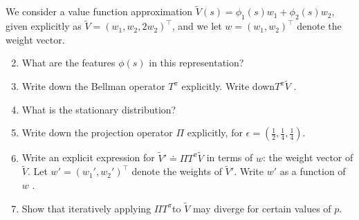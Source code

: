 \begin{exercise}
We consider a value function approximation $\tilde V(s) = {\phi _1}(s){w_1} + {\phi _2}(s){w_2}$, given explicitly as $\tilde V = {\left( {{w_1},{w_2},2{w_2}} \right)^ \top }$, and we let $w = {\left( {{w_1},{w_2}} \right)^ \top }$ denote the weight vector.

\begin{enumerate}
\setcounter{enumi}{1}
  \item What are the features $\phi (s)$ in this representation?
  \item Write down the Bellman operator ${T^\pi }$ explicitly. Write down${T^\pi }\tilde V$ .
  \item What is the stationary distribution?
  \item Write down the projection operator $\Pi $ explicitly, for $\epsilon = \left( \frac{1}{2},\frac{1}{4},\frac{1}{4}\right)$.
  \item Write an explicit expression for $\tilde V' \doteq \Pi {T^\pi }\tilde V$ in terms of $w$: the weight vector of $\tilde V$. Let $w' = {\left( {{w_1}',{w_2}'} \right)^ \top }$ denote the weights of $\tilde V'$. Write $w'$ as a function of $w$ .
  \item Show that iteratively applying $\Pi {T^\pi }$to $\tilde V$ may diverge for certain values of $p$.
\end{enumerate}
\end{exercise}

